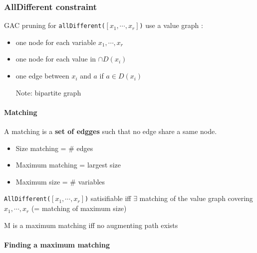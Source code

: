 \subsubsection{AllDifferent constraint}

GAC pruning for \texttt{allDifferent($[x_1,\cdots, x_r]$)} use a value graph :
\begin{itemize}
    \item one node for each variable $x_1,\cdots, x_r$
    \item one node for each value in $\cap D(x_i)$
    \item one edge between $x_i$ and $a$ if $a \in D(x_i)$
    \item[Note:] bipartite graph
\end{itemize}

\paragraph{Matching}
A matching is a \textbf{set of edgges} such that no edge share
a same node.

\begin{itemize}
    \item Size matching = \# edges
    \item Maximum matching = largest size
    \item Maximum size = \# variables
\end{itemize}

\begin{description}
    \item \texttt{AllDifferent($[x_1,\cdots, x_r]$)} satisifiable iff
        $\exists$ matching of the value graph covering $x_1,\cdots, x_r$ (=
        matching of maximum size)
    \item M is a maximum matching iff no augmenting
        path exists
\end{description}

\paragraph{Finding a maximum matching}

